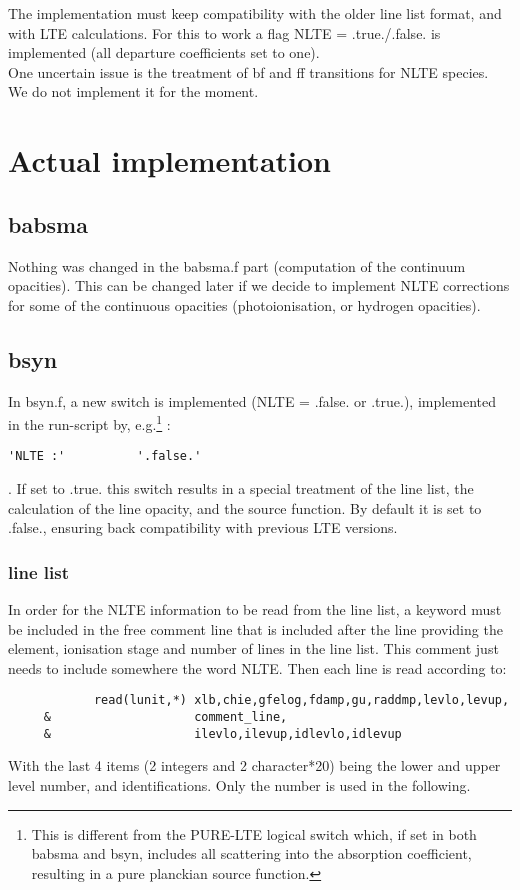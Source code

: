 \documentclass[a4paper,12pt]{article}
\begin{document}
\noindent The implementation must keep compatibility with the older line list format, and with LTE calculations. For 
this to work a flag NLTE = .true./.false. is implemented (all departure coefficients set to one).\\

\noindent One uncertain issue is the treatment of bf and ff transitions for NLTE species. We do not implement it for the
moment.

\section{Actual implementation}
\subsection{babsma}
Nothing was changed in the babsma.f part (computation of the continuum opacities). This can be changed later if we decide
to implement NLTE corrections for some of the continuous opacities (photoionisation, or hydrogen opacities).

\subsection{bsyn}
In bsyn.f, a new switch is implemented (NLTE = .false. or .true.), implemented in the run-script by, e.g.\footnote{This is 
different from the PURE-LTE logical switch which, if set 
in both babsma and bsyn, includes all scattering into the absorption coefficient, resulting in a pure planckian source function.} 
: 
\begin{verbatim}'NLTE :'          '.false.'\end{verbatim}.
If set to .true. this switch results in a special treatment of the line list, the calculation of the line opacity, and the source function. By default it is set to .false., ensuring back compatibility with previous LTE versions.

\subsubsection{line list}
In order for the NLTE information to be read from the line list, a keyword must be included in the free comment line
that is included after the line providing the element, ionisation stage and number of lines in the line list. This comment 
just needs to include somewhere the word NLTE.
Then each line is read according to:
\begin{verbatim}
            read(lunit,*) xlb,chie,gfelog,fdamp,gu,raddmp,levlo,levup,
     &                    comment_line,
     &                    ilevlo,ilevup,idlevlo,idlevup
\end{verbatim}
With the last 4 items (2 integers and 2 character*20) being the lower and upper level number, and identifications.
Only the number is used in the following.
 
\end{document}
